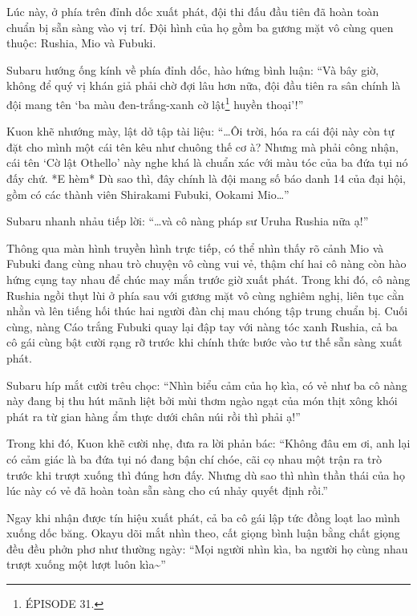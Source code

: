 \documentclass[../main.tex]{subfiles}
\begin{document}
Lúc này, ở phía trên đỉnh dốc xuất phát, đội thi đấu đầu tiên đã hoàn toàn chuẩn bị sẵn sàng vào vị trí. Đội hình của họ gồm ba gương mặt vô cùng quen thuộc: Rushia, Mio và Fubuki.

Subaru hướng ống kính về phía đỉnh dốc, hào hứng bình luận: ``Và bây giờ, không để quý vị khán giả phải chờ đợi lâu hơn nữa, đội đầu tiên ra sân chính là đội mang tên `ba màu đen-trắng-xanh cờ lật\footnote{{\flaregothic ÉPISODE 31}.} huyền thoại'!''

Kuon khẽ nhướng mày, lật dở tập tài liệu: ``\dots Ôi trời, hóa ra cái đội này còn tự đặt cho mình một cái tên kêu như chuông thế cơ à? Nhưng mà phải công nhận, cái tên `Cờ lật Othello' này nghe khá là chuẩn xác với màu tóc của ba đứa tụi nó đấy chứ. *E hèm* Dù sao thì, đây chính là đội mang số báo danh 14 của đại hội, gồm có các thành viên Shirakami Fubuki, Ookami Mio\dots''

Subaru nhanh nhảu tiếp lời: ``\dots và cô nàng pháp sư Uruha Rushia nữa ạ!''


Thông qua màn hình truyền hình trực tiếp, có thể nhìn thấy rõ cảnh Mio và Fubuki đang cùng nhau trò chuyện vô cùng vui vẻ, thậm chí hai cô nàng còn hào hứng cụng tay nhau để chúc may mắn trước giờ xuất phát. Trong khi đó, cô nàng Rushia ngồi thụt lùi ở phía sau với gương mặt vô cùng nghiêm nghị, liên tục cằn nhằn và lên tiếng hối thúc hai người đàn chị mau chóng tập trung chuẩn bị. Cuối cùng, nàng Cáo trắng Fubuki quay lại đập tay với nàng tóc xanh Rushia, cả ba cô gái cùng bật cười rạng rỡ trước khi chính thức bước vào tư thế sẵn sàng xuất phát.

Subaru híp mắt cười trêu chọc: ``Nhìn biểu cảm của họ kìa, có vẻ như ba cô nàng này đang bị thu hút mãnh liệt bởi mùi thơm ngào ngạt của món thịt xông khói phát ra từ gian hàng ẩm thực dưới chân núi rồi thì phải ạ!''

Trong khi đó, Kuon khẽ cười nhẹ, đưa ra lời phản bác: ``Không đâu em ơi, anh lại có cảm giác là ba đứa tụi nó đang bận chí chóe, cãi cọ nhau một trận ra trò trước khi trượt xuống thì đúng hơn đấy. Nhưng dù sao thì nhìn thần thái của họ lúc này có vẻ đã hoàn toàn sẵn sàng cho cú nhảy quyết định rồi.''

Ngay khi nhận được tín hiệu xuất phát, cả ba cô gái lập tức đồng loạt lao mình xuống dốc băng. Okayu dõi mắt nhìn theo, cất giọng bình luận bằng chất giọng đều đều phởn phơ như thường ngày: ``Mọi người nhìn kìa, ba người họ cùng nhau trượt xuống một lượt luôn kìa\~{}''
\end{document}

